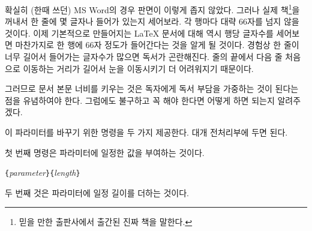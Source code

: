 확실히 (한때 쓰던) MS Word의 경우 판면이 이렇게 좁지 않았다.
그러나 실제 책\footnote{믿을 만한 출판사에서 출간된 진짜 책을 말한다.}을 
꺼내서 한 줄에 몇 글자나 들어가 있는지 세어보라.
각 행마다 대략 66자를 넘지 않을 것이다. 이제 기본적으로 만들어지는 \LaTeX{} 문서에 
대해 역시 행당 글자수를 세어보면 마찬가지로 한 행에 66자 정도가 들어간다는 것을 
알게 될 것이다.
경험상 한 줄이 너무 길어서 들어가는 글자수가 많으면 독서가 곤란해진다.
줄의 끝에서 다음 줄 처음으로 이동하는 거리가 길어서 눈을 이동시키기 더 어려워지기 때문이다.

그러므로 문서 본문 너비를 키우는 것은 독자에게 독서 부담을 가중하는 것이 된다는 점을 유념하여야 한다.
그럼에도 불구하고 꼭 해야 한다면 어떻게 하면 되는지 알려주겠다.

이 파라미터를 바꾸기 위한 명령을 두 가지 제공한다. 대개 전처리부에 두면 된다.

첫 번째 명령은 파라미터에 일정한 값을 부여하는 것이다.

\begin{lscommand}
\verb|{|\emph{parameter}\verb|}{|\emph{length}\verb|}|
\end{lscommand}

두 번째 것은 파라미터에 일정 길이를 더하는 것이다.

